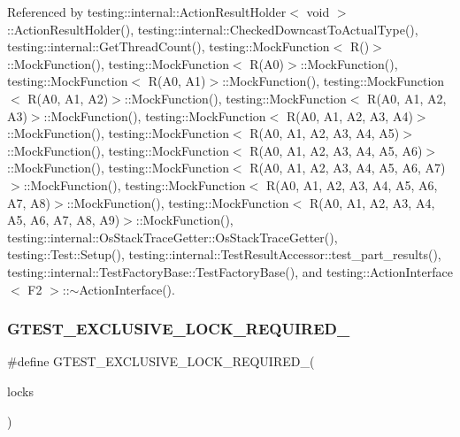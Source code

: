 Referenced by testing\+::internal\+::\+Action\+Result\+Holder$<$ void $>$\+::\+Action\+Result\+Holder(), testing\+::internal\+::\+Checked\+Downcast\+To\+Actual\+Type(), testing\+::internal\+::\+Get\+Thread\+Count(), testing\+::\+Mock\+Function$<$ R()$>$\+::\+Mock\+Function(), testing\+::\+Mock\+Function$<$ R(\+A0)$>$\+::\+Mock\+Function(), testing\+::\+Mock\+Function$<$ R(\+A0, A1)$>$\+::\+Mock\+Function(), testing\+::\+Mock\+Function$<$ R(\+A0, A1, A2)$>$\+::\+Mock\+Function(), testing\+::\+Mock\+Function$<$ R(\+A0, A1, A2, A3)$>$\+::\+Mock\+Function(), testing\+::\+Mock\+Function$<$ R(\+A0, A1, A2, A3, A4)$>$\+::\+Mock\+Function(), testing\+::\+Mock\+Function$<$ R(\+A0, A1, A2, A3, A4, A5)$>$\+::\+Mock\+Function(), testing\+::\+Mock\+Function$<$ R(\+A0, A1, A2, A3, A4, A5, A6)$>$\+::\+Mock\+Function(), testing\+::\+Mock\+Function$<$ R(\+A0, A1, A2, A3, A4, A5, A6, A7)$>$\+::\+Mock\+Function(), testing\+::\+Mock\+Function$<$ R(\+A0, A1, A2, A3, A4, A5, A6, A7, A8)$>$\+::\+Mock\+Function(), testing\+::\+Mock\+Function$<$ R(\+A0, A1, A2, A3, A4, A5, A6, A7, A8, A9)$>$\+::\+Mock\+Function(), testing\+::internal\+::\+Os\+Stack\+Trace\+Getter\+::\+Os\+Stack\+Trace\+Getter(), testing\+::\+Test\+::\+Setup(), testing\+::internal\+::\+Test\+Result\+Accessor\+::test\+\_\+part\+\_\+results(), testing\+::internal\+::\+Test\+Factory\+Base\+::\+Test\+Factory\+Base(), and testing\+::\+Action\+Interface$<$ F2 $>$\+::$\sim$\+Action\+Interface().

\mbox{\label{gtest-port_8h_a149f693bd59fa1bc937af54c0cdcb32f}} 
\subsubsection{\texorpdfstring{G\+T\+E\+S\+T\+\_\+\+E\+X\+C\+L\+U\+S\+I\+V\+E\+\_\+\+L\+O\+C\+K\+\_\+\+R\+E\+Q\+U\+I\+R\+E\+D\+\_\+}{GTEST\_EXCLUSIVE\_LOCK\_REQUIRED\_}}
{\footnotesize\ttfamily \#define G\+T\+E\+S\+T\+\_\+\+E\+X\+C\+L\+U\+S\+I\+V\+E\+\_\+\+L\+O\+C\+K\+\_\+\+R\+E\+Q\+U\+I\+R\+E\+D\+\_\+(\begin{DoxyParamCaption}\item[{}]{locks }\end{DoxyParamCaption})}



